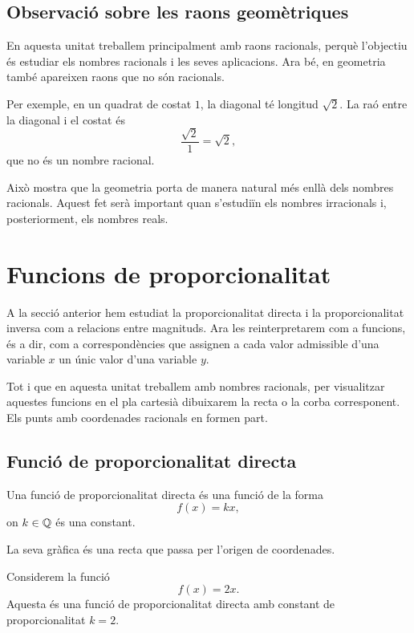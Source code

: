 \subsection{Observació sobre les raons geomètriques}

En aquesta unitat treballem principalment amb raons racionals, perquè l'objectiu és estudiar els nombres racionals i les seves aplicacions. Ara bé, en geometria també apareixen raons que no són racionals.

Per exemple, en un quadrat de costat \(1\), la diagonal té longitud \(\sqrt{2}\). La raó entre la diagonal i el costat és
\[
	\frac{\sqrt{2}}{1}
	=
	\sqrt{2},
\]
que no és un nombre racional.

Això mostra que la geometria porta de manera natural més enllà dels nombres racionals. Aquest fet serà important quan s'estudiïn els nombres irracionals i, posteriorment, els nombres reals.


\section{Funcions de proporcionalitat}

A la secció anterior hem estudiat la proporcionalitat directa i la proporcionalitat inversa com a relacions entre magnituds. Ara les reinterpretarem com a funcions, és a dir, com a correspondències que assignen a cada valor admissible d'una variable \(x\) un únic valor d'una variable \(y\).

Tot i que en aquesta unitat treballem amb nombres racionals, per visualitzar aquestes funcions en el pla cartesià dibuixarem la recta o la corba corresponent. Els punts amb coordenades racionals en formen part.

\subsection{Funció de proporcionalitat directa}

Una funció de proporcionalitat directa és una funció de la forma
\[
	f(x)=kx,
\]
on \(k\in\mathbb{Q}\) és una constant.

La seva gràfica és una recta que passa per l'origen de coordenades.

\begin{exemple}
Considerem la funció
\[
	f(x)=2x.
\]
Aquesta és una funció de proporcionalitat directa amb constant de proporcionalitat \(k=2\).
\end{exemple}

